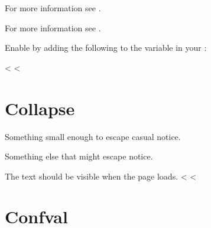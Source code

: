 \documentclass[letterpaper,10pt,english]{sphinxmanual}
\begin{document}
For more information see  .


\label{\detokenize{installation:extensions-4}}

\begin{sphinxVerbatim}[commandchars=\\\{\}]
  \PYG{p}{[}
    \PYG{p}{]}
\end{sphinxVerbatim}

For more information see  .


\label{\detokenize{installation:extensions-5}}

\vspace{10px}

Enable  by adding the following
to the  variable in your :

\begin{sphinxVerbatim}[commandchars=\\\{\}]
  \PYG{p}{[}
    \PYG{p}{]}
\end{sphinxVerbatim}

<%
\sphinxstepscope
<%

\chapter{Collapse}
\label{\detokenize{collapse:collapse}}\label{\detokenize{collapse::doc}}
Something small enough to escape casual notice.

Something else that might escape notice.

The text should be visible when the page loads.
<%
\sphinxstepscope
<%

\chapter{Confval}
\label{\detokenize{confval:confval}}\label{\detokenize{confval::doc}}
\end{document}
